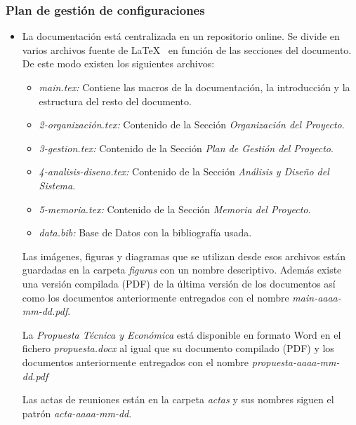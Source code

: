 \subsubsection{Plan de gestión de configuraciones}
\begin{itemize}
    \item La documentación está centralizada en un repositorio online. Se divide en varios archivos fuente de \LaTeX~ en función de las secciones del documento. De este modo existen los siguientes archivos:
		\begin{itemize}
			\item \textit{main.tex:} Contiene las macros de la documentación, la introducción y la estructura del resto del documento.
			\item \textit{2-organización.tex:} Contenido de la Sección \textit{Organización del Proyecto}.
			\item \textit{3-gestion.tex:} Contenido de la Sección \textit{Plan de Gestión del Proyecto}.
			\item \textit{4-analisis-diseno.tex:} Contenido de la Sección \textit{Análisis y Diseño del Sistema}.
			\item \textit{5-memoria.tex:} Contenido de la Sección \textit{Memoria del Proyecto}.
			\item \textit{data.bib:} Base de Datos con la bibliografía usada.
		\end{itemize}
		Las imágenes, figuras y diagramas que se utilizan desde esos archivos están guardadas en la carpeta \textit{figuras} con un nombre descriptivo. Además existe una versión compilada (PDF) de la última versión de los documentos así como los documentos anteriormente entregados con el nombre \textit{main-aaaa-mm-dd.pdf}.

		La \textit{Propuesta Técnica y Económica} está disponible en formato Word en el fichero \textit{propuesta.docx} al igual que su documento compilado (PDF) y los documentos anteriormente entregados con el nombre \textit{propuesta-aaaa-mm-dd.pdf}

		Las actas de reuniones están en la carpeta \textit{actas} y sus nombres siguen el patrón \textit{acta-aaaa-mm-dd}.


\end{itemize}
